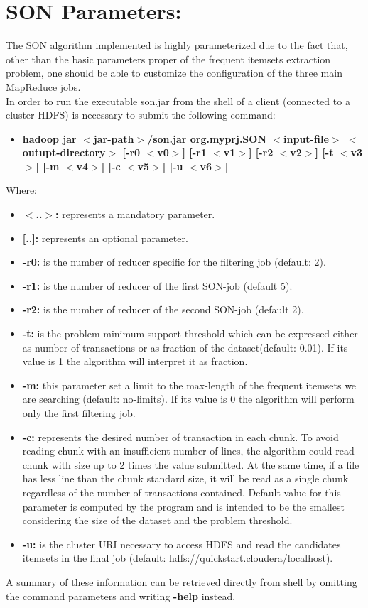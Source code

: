 \documentclass[]{report}
\begin{document}
\section*{SON Parameters:}
	
	The SON algorithm implemented is highly parameterized due to the fact that, other than the basic parameters proper of the frequent itemsets extraction problem, one should be able to customize the configuration of the three main MapReduce jobs.\\
	In order to run the executable son.jar from the shell of a client (connected to a cluster HDFS) is necessary to submit the following command:
	\begin{itemize}
		\item \textbf{ hadoop jar $<$jar-path$>$/son.jar org.myprj.SON $<$input-file$>$ $<$outupt-directory$>$ [-r0 $<$v0$>$] [-r1 $<$v1$>$] [-r2 $<$v2$>$] [-t $<$v3$>$] [-m $<$v4$>$] [-c $<$v5$>$] [-u $<$v6$>$] }
	\end{itemize}
	Where:
	\begin{itemize}	
		\item \textbf{$<$..$>$:} represents a mandatory parameter.
		\item \textbf{[..]:} represents an optional parameter.
		\item \textbf{-r0:} is the number of reducer specific for the filtering job (default: 2).	
		\item \textbf{-r1:} is the number of reducer of the first SON-job (default 5).
		\item \textbf{-r2:} is the number of reducer of the second SON-job (default 2).
		\item \textbf{-t:} is the problem minimum-support threshold which can be expressed either as number of transactions or as fraction of the dataset(default: 0.01). If its value is 1 the algorithm will interpret it as fraction.
		\item \textbf{-m:} this parameter set a limit to the max-length of the frequent itemsets we are searching (default: no-limits). If its value is 0 the algorithm will perform only the first filtering job.
		\item \textbf{-c:} represents the desired number of transaction in each chunk. To avoid reading chunk with an insufficient number of lines, the algorithm could read chunk with size up to 2 times the value submitted. At the same time, if a file has less line than the chunk standard size, it will be read as a single chunk regardless of the number of transactions contained. Default value for this parameter is computed by the program and is intended to be the smallest considering the size of the dataset and the problem threshold. 
		\item \textbf{-u:} is the cluster URI necessary to access HDFS and read the candidates itemsets in the final job (default: hdfs://quickstart.cloudera/localhost).
	\end{itemize}    		
	A summary of these information can be retrieved directly from shell by omitting the command parameters and writing \textbf{-help} instead.
	
\end{document}
